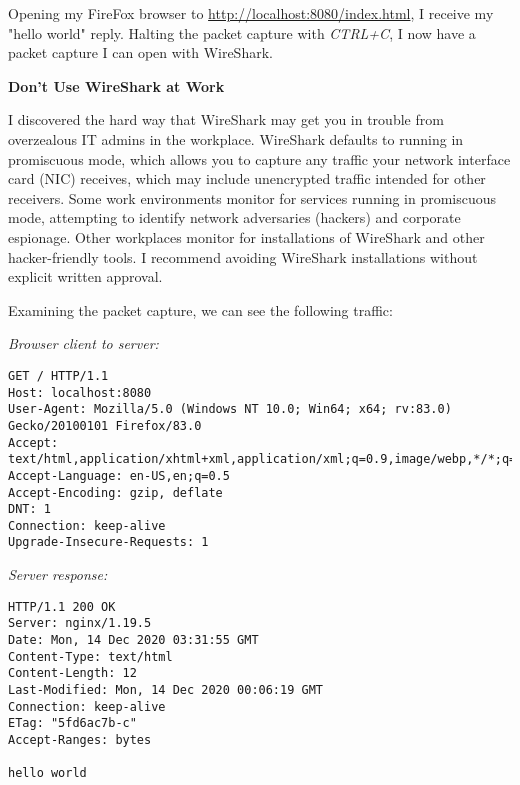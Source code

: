 Opening my FireFox browser to \url{http://localhost:8080/index.html}, I receive my "hello world" reply.  Halting the packet capture with \textit{CTRL+C}, I now have a packet capture I can open with WireShark.

\begin{sidebar}
\begin{center}
\textbf{Don't Use WireShark at Work}
\end{center}
I discovered the hard way that WireShark may get you in trouble from overzealous IT admins in the workplace.  WireShark defaults to running in promiscuous mode, which allows you to capture any traffic your network interface card (NIC) receives, which may include unencrypted traffic intended for other receivers.  Some work environments monitor for services running in promiscuous mode, attempting to identify network adversaries (hackers) and corporate espionage.  Other workplaces monitor for installations of WireShark and other hacker-friendly tools.  I recommend avoiding WireShark installations without explicit written approval.
\end{sidebar}

Examining the packet capture, we can see the following traffic:

\textit{Browser client to server:}

\begin{code}
\vspace{-\baselineskip}
\begin{lstlisting}[belowskip=-\baselineskip]
GET / HTTP/1.1
Host: localhost:8080
User-Agent: Mozilla/5.0 (Windows NT 10.0; Win64; x64; rv:83.0) Gecko/20100101 Firefox/83.0
Accept: text/html,application/xhtml+xml,application/xml;q=0.9,image/webp,*/*;q=0.8
Accept-Language: en-US,en;q=0.5
Accept-Encoding: gzip, deflate
DNT: 1
Connection: keep-alive
Upgrade-Insecure-Requests: 1
\end{lstlisting}
\end{code}

\textit{Server response:}

\begin{code}
\vspace{-\baselineskip}
\begin{lstlisting}[belowskip=-\baselineskip]
HTTP/1.1 200 OK
Server: nginx/1.19.5
Date: Mon, 14 Dec 2020 03:31:55 GMT
Content-Type: text/html
Content-Length: 12
Last-Modified: Mon, 14 Dec 2020 00:06:19 GMT
Connection: keep-alive
ETag: "5fd6ac7b-c"
Accept-Ranges: bytes

hello world
\end{lstlisting}
\end{code}

